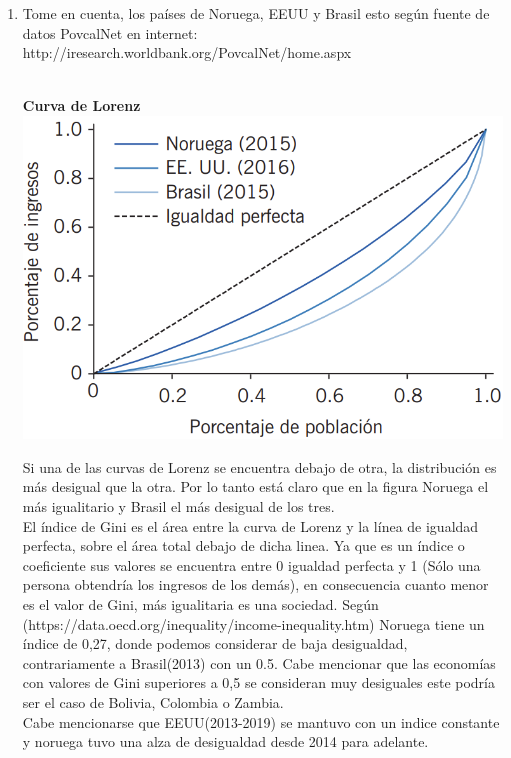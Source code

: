 \begin{enumerate}[\bfseries 1.]
    \item Tome en cuenta, los países de Noruega, EEUU y Brasil esto según fuente de datos PovcalNet en internet: http://iresearch.worldbank.org/PovcalNet/home.aspx\\\\  
	\begin{center}
	    \textbf{\Large Curva de Lorenz}\\
	    \includegraphics[scale=.35]{codigoFuente/tareas/decisiones/image/gini.png}
	\end{center}
	\vspace{.7cm}
    Si una de las curvas de Lorenz se encuentra debajo de otra, la distribución  es más desigual que la otra. Por lo tanto está claro que en la figura Noruega el más igualitario y Brasil el más desigual de los tres.\\
    El índice de Gini es el área entre la curva de Lorenz y la línea de igualdad perfecta, sobre el área total debajo de dicha linea. Ya que es un índice o coeficiente sus valores se encuentra entre 0 igualdad perfecta y 1 (Sólo una persona obtendría los ingresos de los demás), en consecuencia cuanto menor es el valor de Gini, más igualitaria es una sociedad. 
    Según (https://data.oecd.org/inequality/income-inequality.htm) Noruega tiene un índice de 0,27, donde podemos considerar de baja desigualdad, contrariamente a Brasil(2013) con un 0.5. Cabe mencionar que las economías con valores de Gini superiores a 0,5 se consideran muy desiguales este podría ser el caso de Bolivia,  Colombia o Zambia. \\
    Cabe mencionarse que EEUU(2013-2019) se mantuvo con un indice constante y noruega tuvo una alza de desigualdad desde 2014 para adelante.\\\\ 


\end{enumerate}
